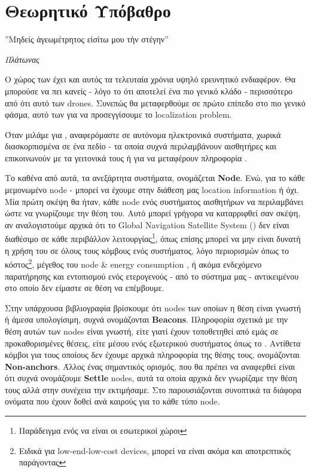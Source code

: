 \chapter{Θεωρητικό Υπόβαθρο} %
\label{chap:Chapter3} %
\epigraph{''Μηδείς ἀγεωμέτρητος εἰσίτω μου τὴν στέγην” }{\textit{Πλάτωνας}}

O χώρος των  έχει και αυτός τα τελευταία χρόνια υψηλό ερευνητικό ενδιαφέρον.
Θα μπορούσε να πει κανείς - λόγο το ότι αποτελεί ένα πιο γενικό κλάδο - περισσότερο από ότι αυτό των 
drones. Συνεπώς θα μεταφερθούμε σε πρώτο επίπεδο στο πιο γενικό φάσμα, αυτό των  
για να προσεγγίσουμε το localization problem. 

Όταν μιλάμε για , αναφερόμαστε σε αυτόνομα ηλεκτρονικά συστήματα, χωρικά διασκορπισμένα σε ένα πεδίο - τα οποία συχνά περιλαμβάνουν
αισθητήρες και επικοι\-νωνούν με τα γειτονικά τους ή  για να μεταφέρουν πληροφορία \cite{wsn-wikipedia} \cite{farooqiazam2016location}.

Το καθένα από αυτά, τα ανεξάρτητα συστήματα, ονομάζεται \textbf{Node}. Ενώ, για το κάθε μεμονωμένο node - 
μπορεί να έχουμε στην διάθεση μας location information ή όχι. 
Μία πρώτη σκέψη θα ήταν, κάθε node ενός συστήματος αισθητήρων να περιλαμβάνει  ώστε να γνωρίζουμε 
την θέση του. Αυτό μπορεί γρήγορα να καταρριφθεί σαν σκέψη, αν αναλογιστούμε αρχικά ότι το Global Navigation Satellite System ()
δεν είναι διαθέσιμο σε κάθε περιβάλλον λειτουργίας\footnote{Παράδειγμα ενός να είναι οι εσωτερικοί χώροι}, όπως επίσης μπορεί να μην είναι δυνατή η χρήση του σε όλους τους κόμβους
ενός συστήματος, λόγο περιορισμών όπως το κόστος\footnote{Ειδικά για low-end-low-cost devices, μπορεί να είναι ακόμα και αποτρεπτικός παράγοντας}, μέγεθος του node \& energy consumption \cite{farooqiazam2016location}, ή ακόμα ενδεχόμενο παρατήρησης
και εντοπισμού ενός ετερογενούς - από το σύστημα μας - αντικειμένου στο οποίο δεν είμαστε σε θέση να επέμβουμε.   

Στην υπάρχουσα βιβλιογραφία \cite{farooqiazam2016location} \cite{wsn-Localization-systems} \cite{wsn-Localization-techniques} βρίσκουμε ότι
nodes των οποίων η θέση είναι γνωστή ή άμεσα υπολογίσιμη, συχνά ονομάζονται \textbf{Beacons}. Πληροφορία σχετικά με την θέση αυτών
των nodes είναι γνωστή, είτε γιατί έχουν τοποθετηθεί από εμάς σε προκαθορισμένες θέσεις, είτε μέσου ενός εξωτερικού συστήματος
όπως το  \cite{angle-of-arrival}.
Αντίθετα κόμβοι για τους οποίους δεν έχουμε αρχικά πληροφορία της θέσης τους, ονομάζονται \textbf{Non-anchors}.
Άλλος ένας σημαντικός ορισμός, που θα πρέπει να αναφερθεί είναι ότι συχνά ονομάζουμε \textbf{Settle} nodes, 
αυτά τα οποία αρχικά δεν γνωρίζαμε την θέση τους αλλά στην συνέχεια την εκτιμήσαμε.
Στο  παρουσιάζονται συνοπτικά τα διάφορα ονόματα που έχουν δοθεί ανά 
καιρούς για το κάθε τύπο node.

